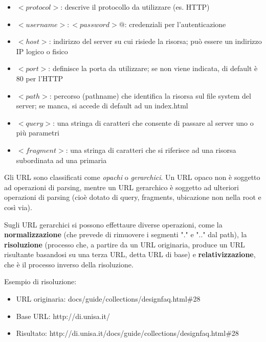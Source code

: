             \begin{itemize}
                \item 
                \(<protocol>\): descrive il protocollo da utilizzare (es. HTTP)
                \item
                \(<username>:<password>@\): credenziali per l'autenticazione
                \item
                \(<host>\): indirizzo del server su cui risiede la risorsa; può essere un indirizzo IP logico o fisico
                \item
                \(<port>\): definisce la porta da utilizzare; se non viene indicata, di default è 80 per l'HTTP
                \item
                \(<path>\): percorso (pathname) che identifica la risorsa sul file system del server; se manca, si accede di default ad un index.html
                \item
                \(<query>\): una stringa di caratteri che consente di passare al server uno o più parametri
                \item
                \(<fragment>\): una stringa di caratteri che si riferisce ad una risorsa subordinata ad una primaria
            \end{itemize}
            
            Gli URL sono classificati come \textit{opachi} o \textit{gerarchici}. Un URL opaco non è soggetto ad operazioni di parsing, mentre un URL gerarchico è soggetto ad ulteriori operazioni di parsing (cioè dotato di query, fragments, ubicazione non nella root e così via). 
            
            \vspace{3mm}
            
            Sugli URL gerarchici si possono effettaure diverse operazioni, come la \textbf{normalizzazione} (che prevede di rimuovere i segmenti "." e ".." dal path), la \textbf{risoluzione} (processo che, a partire da un URL originaria, produce un URL risultante basandosi su una terza URL, detta URL di base) e \textbf{relativizzazione}, che è il processo inverso della risoluzione.
            
            \vspace{3mm}
            
            Esempio di risoluzione:
            
            \begin{itemize}
                \item URL originaria: docs/guide/collections/designfaq.html\#28
                \item Base URL: http://di.unisa.it/
                \item Risultato: http://di.unisa.it/docs/guide/collections/designfaq.html\#28
            \end{itemize}
    
